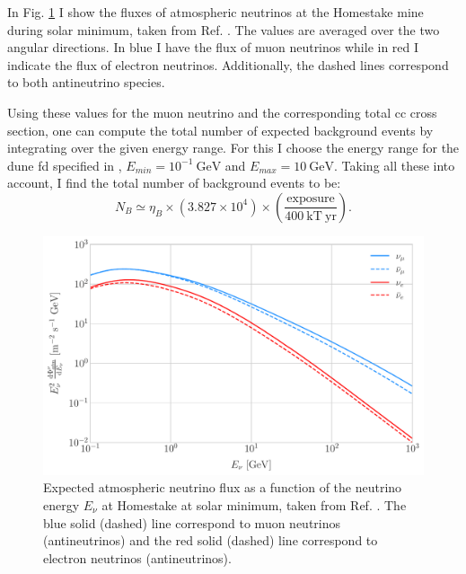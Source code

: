 In Fig. \ref{fig:homestake_fluxes} I show the fluxes of atmospheric neutrinos at the Homestake mine during solar minimum, taken from Ref. \cite{Honda2015}. The values are averaged over the two angular directions. In blue I have the flux of muon neutrinos while in red I indicate the flux of electron neutrinos. Additionally, the dashed lines correspond to both antineutrino species.

Using these values for the muon neutrino and the corresponding total \gls{cc} cross section, one can compute the total number of expected background events by integrating over the given energy range. For this I choose the energy range for the \gls{dune} \gls{fd} specified in \cite{DUNE2020TDR2}, $E_{min} = 10^{-1} \ \mathrm{GeV}$ and $E_{max} = 10 \ \mathrm{GeV}$. Taking all these into account, I find the total number of background events to be:
\begin{equation}\label{4.4}
	N_{B} \simeq  \eta_{B} \times \left(3.827 \times 10^{4}\right) \times \left(\frac{\mathrm{exposure}}{400 \ \mathrm{kT \ yr}}\right).
\end{equation}

\begin{figure}[t]
	\centering
	\includegraphics[width=0.9\linewidth]{Images/DM_Analysis/homestake_fluxes}
	\caption[Expected atmospheric neutrino flux as a function of the neutrino energy $E_{\nu}$ at Homestake at solar minimum.]{Expected atmospheric neutrino flux as a function of the neutrino energy $E_{\nu}$ at Homestake at solar minimum, taken from Ref. \cite{Honda2015}. The blue solid (dashed) line correspond to muon neutrinos (antineutrinos) and the red solid (dashed) line correspond to electron neutrinos (antineutrinos).}
	\label{fig:homestake_fluxes}
\end{figure}

